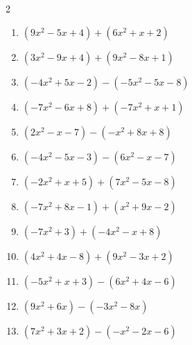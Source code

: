 \begin{multicols}{2}
\begin{enumerate}

  \item $(9x^{2}-5x+4)+(6x^{2}+x+2)$


  \item $(3x^{2}-9x+4)+(9x^{2}-8x+1)$


  \item $(-4x^{2}+5x-2)-(-5x^{2}-5x-8)$


  \item $(-7x^{2}-6x+8)+(-7x^{2}+x+1)$


  \item $(2x^{2}-x-7)-(-x^{2}+8x+8)$


  \item $(-4x^{2}-5x-3)-(6x^{2}-x-7)$


  \item $(-2x^{2}+x+5)+(7x^{2}-5x-8)$


  \item $(-7x^{2}+8x-1)+(x^{2}+9x-2)$


  \item $(-7x^{2}+3)+(-4x^{2}-x+8)$


\columnbreak %

  \item $(4x^{2}+4x-8)+(9x^{2}-3x+2)$


  \item $(-5x^{2}+x+3)-(6x^{2}+4x-6)$


  \item $(9x^{2}+6x)-(-3x^{2}-8x)$


  \item $(7x^{2}+3x+2)-(-x^{2}-2x-6)$



\end{enumerate}
\end{multicols}
